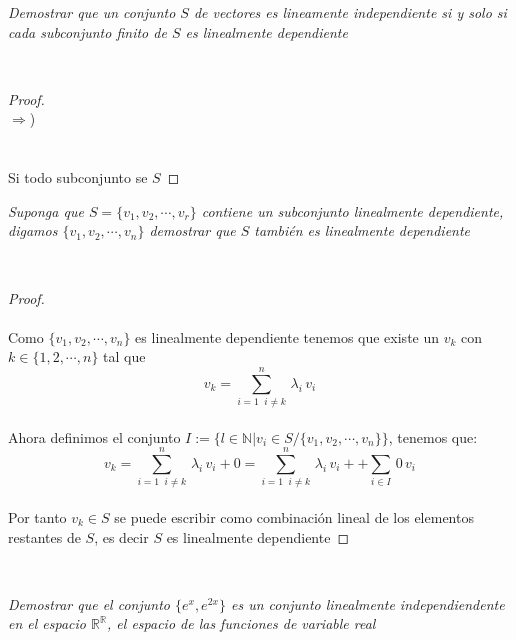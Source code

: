 \documentclass[11pt,letterpaper]{article}
\newcommand{\R}{\mathbb{R}}
\newcommand{\N}{\mathbb{N}}
\begin{document}
\begin{tcolorbox}[
	title = \textcolor{black}{\textcolor{white}{Problema 10}},]
\textit{Demostrar que un conjunto $S$ de vectores es lineamente independiente si y solo si cada subconjunto finito de $S$ es linealmente dependiente 
}
\end{tcolorbox}\,\\
\begin{proof}\,\\
   $\Rightarrow$)\,\\
   \,\\
  
   \,\\
   Si todo subconjunto se $S$
\end{proof}
\begin{tcolorbox}[
	title = \textcolor{black}{\textcolor{white}{Problema 11}},]
\textit{Suponga que $S=\{v_1,v_2,\cdots,v_r\}$ contiene un subconjunto linealmente dependiente, digamos $\{v_1,v_2,\cdots,v_n\}$
demostrar que $S$ tambi\'en es linealmente dependiente
}
\end{tcolorbox}\,\\
\begin{proof}\,\\
    \,\\
    Como $\{v_1,v_2,\cdots,v_n\}$ es linealmente dependiente tenemos que existe un $v_k$ con $k\in \{1,2,\cdots,n\}$ tal que\,\\
    \begin{equation*}
        v_k=\sum_{i=1\,\,\:
        i\neq k}^{n}\,\lambda_i\,v_i
    \end{equation*}\,\\
    Ahora definimos el conjunto $I:=\{l\in \N|v_i\in S/\{v_1,v_2,\cdots,v_n\}\}$, tenemos que:\,\\
    \begin{equation*}
        v_k=\sum_{i=1\,\,\:
        i\neq k}^{n}\,\lambda_i\,v_i+0=\sum_{i=1\,\,\:
        i\neq k}^{n}\,\lambda_i\,v_i++\sum_{i\in I}\,0\,v_i
    \end{equation*}\,\\
Por tanto $v_k\in S$ se puede escribir como combinaci\'on lineal de los elementos restantes de $S$, es decir $S$ es linealmente dependiente
\end{proof}\,\\
\begin{tcolorbox}[
	title = \textcolor{black}{\textcolor{white}{Problema 12}},]
\textit{Demostrar que el conjunto $\{e^x,e^{2x}\}$ es un conjunto linealmente independiendente en el espacio $\R^{\R}$, el espacio de 
las funciones de variable real
}
\end{tcolorbox}\,\\
\end{document}
